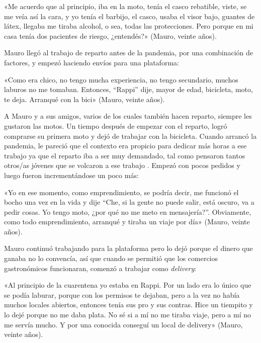\begin{refsection}
\begin{gbcita}
«Me acuerdo que al principio, iba en la moto, tenía el casco rebatible, viste, se me veía así la cara, y yo tenía el barbijo, el casco, usaba el visor bajo, guantes de látex, llegaba me tiraba alcohol, o sea, todas las protecciones. Pero porque en mi casa tenía dos pacientes de riesgo, ¿entendés?» (Mauro, veinte años).

\end{gbcita}

Mauro llegó al trabajo de reparto antes de la pandemia, por una combinación de factores, y empezó haciendo envíos para una plataforma:


\begin{gbcita}
«Como era chico, no tengo mucha experiencia, no tengo secundario, muchos laburos no me tomaban. Entonces, “Rappi” dije, mayor de edad, bicicleta, moto, te deja. Arranqué con la bici» (Mauro, veinte años).

\end{gbcita}

A Mauro y a sus amigos, varios de los cuales también hacen reparto, siempre les gustaron las motos. Un tiempo después de empezar con el reparto, logró comprarse su primera moto y dejó de trabajar con la bicicleta. Cuando arrancó la pandemia, le pareció que el contexto era propicio para dedicar más horas a ese trabajo ya que el reparto iba a ser muy demandado, tal como pensaron tantos otros/as jóvenes que se volcaron a ese trabajo \protect\parencite{4235-PEREZMARTIRENA2022}. Empezó con pocos pedidos y luego fueron incrementándose un poco más:


\begin{gbcita}
«Yo en ese momento, como emprendimiento, se podría decir, me funcionó el bocho una vez en la vida y dije “Che, si la gente no puede salir, está oscuro, va a pedir cosas. Yo tengo moto, ¿por qué no me meto en mensajería?”. Obviamente, como todo emprendimiento, arranqué y tiraba un viaje por día» (Mauro, veinte años).

\end{gbcita}

Mauro continuó trabajando para la plataforma pero lo dejó porque el dinero que ganaba no lo convencía, así que cuando se permitió que los comercios gastronómicos funcionaran, comenzó a trabajar como \emph{delivery}:


\begin{gbcita}
«Al principio de la cuarentena yo estaba en Rappi. Por un lado era lo único que se podía laburar, porque con los permisos te dejaban, pero a la vez no había muchos locales abiertos, entonces tenía sus pro y sus contras. Hice un tiempito y lo dejé porque no me daba plata. No sé si a mí no me tiraba viaje, pero a mí no me servía mucho. Y por una conocida conseguí un local de delivery» (Mauro, veinte años).


\end{gbcita}
\end{refsection}
